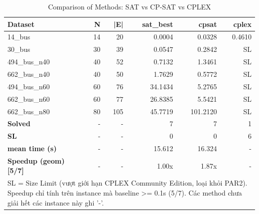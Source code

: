 \begin{table}[htbp]
\centering
\caption{Comparison of Methods: SAT vs CP-SAT vs CPLEX}
\label{tab:table_methods}
\begin{tabular}{lrrrrr}
\toprule
Dataset & N & |E| & sat\_best & cpsat & cplex \\
\midrule
14\_bus & 14 & 20 & 0.0004 & 0.0328 & 0.4610 \\
30\_bus & 30 & 39 & 0.0547 & 0.2842 & SL \\
494\_bus\_n40 & 40 & 52 & 0.7132 & 1.3461 & SL \\
662\_bus\_n40 & 40 & 50 & 1.7629 & 0.5772 & SL \\
494\_bus\_n60 & 60 & 76 & 34.1434 & 5.2765 & SL \\
662\_bus\_n60 & 60 & 77 & 26.8385 & 5.5421 & SL \\
662\_bus\_n80 & 80 & 105 & 45.7719 & 101.2120 & SL \\
\midrule
\textbf{Solved} & - & - & 7 & 7 & 1 \\
\textbf{SL} & - & - & 0 & 0 & 6 \\
\textbf{mean time (s)} & - & - & 15.612 & 16.324 & - \\
\textbf{Speedup (geom) [5/7]} & - & - & 1.00x & 1.87x & - \\
\bottomrule
\multicolumn{6}{l}{\footnotesize SL = Size Limit (vượt giới hạn CPLEX Community Edition, loại khỏi PAR2). Speedup chỉ tính trên instance mà baseline >= 0.1s (5/7). Các method chưa giải hết các instance này ghi '-'.} \\
\end{tabular}
\end{table}
